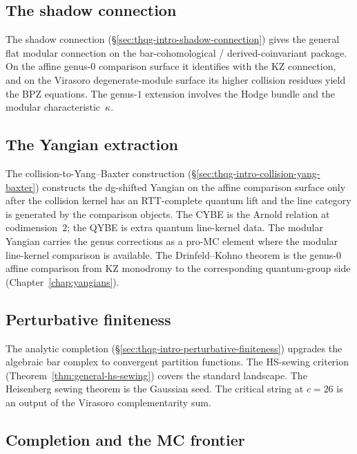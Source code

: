 \subsection{The shadow connection}
\label{subsec:thqg-intro-guide-connection}

The shadow connection
(\S\ref{sec:thqg-intro-shadow-connection}) gives the general flat
modular connection on the bar-cohomological / derived-coinvariant
package. On the affine genus-$0$ comparison surface it identifies with
the KZ connection, and on the Virasoro degenerate-module surface its
higher collision residues yield the BPZ equations. The genus-$1$
extension involves the
Hodge bundle and the modular characteristic~$\kappa$.

\subsection{The Yangian extraction}
\label{subsec:thqg-intro-guide-yangian}

The collision-to-Yang--Baxter construction
(\S\ref{sec:thqg-intro-collision-yang-baxter}) constructs the
dg-shifted Yangian on the affine comparison surface only after the
collision kernel has an RTT-complete quantum lift and the line category
is generated by the comparison objects. The CYBE is the Arnold relation
at codimension~$2$; the QYBE is extra quantum line-kernel data. The
modular Yangian carries the genus corrections as a pro-MC element where
the modular line-kernel comparison is available. The Drinfeld--Kohno
theorem is the genus-$0$ affine comparison from KZ monodromy to the
corresponding quantum-group side
(Chapter~\ref{chap:yangians}).

\subsection{Perturbative finiteness}
\label{subsec:thqg-intro-guide-finiteness}

The analytic completion
(\S\ref{sec:thqg-intro-perturbative-finiteness}) upgrades the
algebraic bar complex to convergent partition functions. The
HS-sewing criterion (Theorem~\ref{thm:general-hs-sewing}) covers
the standard landscape. The Heisenberg sewing theorem is the
Gaussian seed. The critical string at $c = 26$ is an output of
the Virasoro complementarity sum.

\subsection{Completion and the MC frontier}
\label{subsec:thqg-intro-guide-completion}

